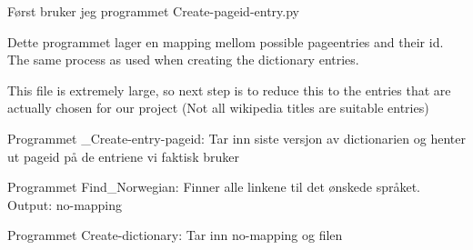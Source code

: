 Først bruker jeg programmet Create-pageid-entry.py

Dette programmet lager en mapping mellom possible pageentries and their id. The same process as used when creating the dictionary entries. 

This file is extremely large, so next step is to reduce this to the entries that are actually chosen for our project (Not all wikipedia titles are suitable entries)

Programmet _Create-entry-pageid: 
Tar inn siste versjon av dictionarien og henter ut pageid på de entriene vi faktisk bruker

Programmet Find_Norwegian: Finner alle linkene til det ønskede språket. 
Output: no-mapping

Programmet Create-dictionary: 
Tar inn no-mapping og filen 
